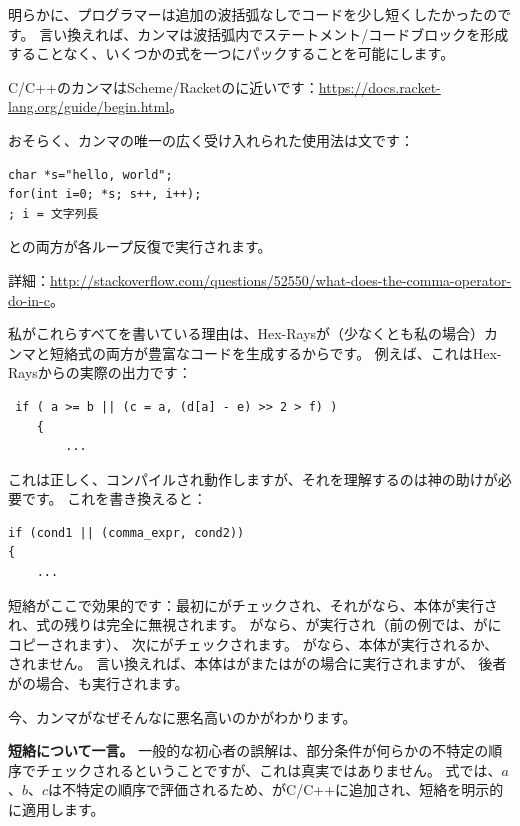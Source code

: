 明らかに、プログラマーは追加の波括弧なしでコードを少し短くしたかったのです。
言い換えれば、カンマは波括弧内でステートメント/コードブロックを形成することなく、いくつかの式を一つにパックすることを可能にします。

C/C++のカンマはScheme/Racketのに近いです：\url{https://docs.racket-lang.org/guide/begin.html}。

おそらく、カンマの唯一の広く受け入れられた使用法は文です：

\begin{lstlisting}
char *s="hello, world";
for(int i=0; *s; s++, i++);
; i = 文字列長
\end{lstlisting}

との両方が各ループ反復で実行されます。

詳細：\url{http://stackoverflow.com/questions/52550/what-does-the-comma-operator-do-in-c}。

私がこれらすべてを書いている理由は、Hex-Raysが（少なくとも私の場合）カンマと短絡式の両方が豊富なコードを生成するからです。
例えば、これはHex-Raysからの実際の出力です：

\begin{lstlisting}
 if ( a >= b || (c = a, (d[a] - e) >> 2 > f) )
    {
    	...
\end{lstlisting}

これは正しく、コンパイルされ動作しますが、それを理解するのは神の助けが必要です。
これを書き換えると：

\begin{lstlisting}
if (cond1 || (comma_expr, cond2))
{
	...
\end{lstlisting}

短絡がここで効果的です：最初にがチェックされ、それがなら、本体が実行され、式の残りは完全に無視されます。
がなら、が実行され（前の例では、がにコピーされます）、
次にがチェックされます。
がなら、本体が実行されるか、されません。
言い換えれば、本体はがまたはがの場合に実行されますが、
後者がの場合、も実行されます。

今、カンマがなぜそんなに悪名高いのかがわかります。

\textbf{短絡について一言。}
一般的な初心者の誤解は、部分条件が何らかの不特定の順序でチェックされるということですが、これは真実ではありません。
式では、$a$、$b$、$c$は不特定の順序で評価されるため、\TT{||}がC/C++に追加され、短絡を明示的に適用します。

